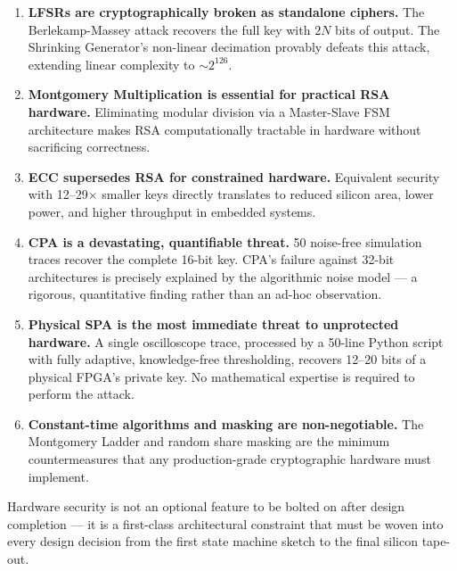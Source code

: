 \documentclass[conference, a4paper]{IEEEtran}
\begin{document}
\begin{enumerate}
    \item \textbf{LFSRs are cryptographically broken as standalone ciphers.} The Berlekamp-Massey attack recovers the full key with $2N$ bits of output. The Shrinking Generator's non-linear decimation provably defeats this attack, extending linear complexity to $\sim 2^{126}$.

    \item \textbf{Montgomery Multiplication is essential for practical RSA hardware.} Eliminating modular division via a Master-Slave FSM architecture makes RSA computationally tractable in hardware without sacrificing correctness.

    \item \textbf{ECC supersedes RSA for constrained hardware.} Equivalent security with 12--29$\times$ smaller keys directly translates to reduced silicon area, lower power, and higher throughput in embedded systems.

    \item \textbf{CPA is a devastating, quantifiable threat.} 50 noise-free simulation traces recover the complete 16-bit key. CPA's failure against 32-bit architectures is precisely explained by the algorithmic noise model — a rigorous, quantitative finding rather than an ad-hoc observation.

    \item \textbf{Physical SPA is the most immediate threat to unprotected hardware.} A single oscilloscope trace, processed by a 50-line Python script with fully adaptive, knowledge-free thresholding, recovers 12--20 bits of a physical FPGA's private key. No mathematical expertise is required to perform the attack.

    \item \textbf{Constant-time algorithms and masking are non-negotiable.} The Montgomery Ladder and random share masking are the minimum countermeasures that any production-grade cryptographic hardware must implement.
\end{enumerate}

Hardware security is not an optional feature to be bolted on after design completion — it is a first-class architectural constraint that must be woven into every design decision from the first state machine sketch to the final silicon tape-out.
\end{document}

